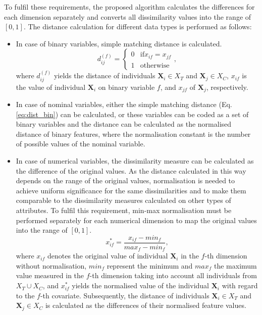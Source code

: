 		To fulfil these requirements, the proposed algorithm calculates the differences for each dimension separately and converts all dissimilarity values into the range of $[0,1]$. The distance calculation for different data types is performed as follows:					
		\begin{itemize}
			\item In case of binary variables, simple matching distance is calculated.
			      \begin{equation}
			      	\label{eq:dist_bin}
			      	d_{ij}^{(f)}=
			      	\begin{cases} 
			      		0 & \text{if} x_{if}=x_{jf} \\
			      		1 & \text{otherwise}        
			      	\end{cases},
			      \end{equation}
			      \noindent where $d_{ij}^{(f)}$ yields the distance of individuals $\textbf{X}_i \in X_T$ and $\textbf{X}_j \in X_C$, $x_{if}$ is the value of individual $\textbf{X}_i$ on binary variable $f$, and $x_{jf}$ of $\textbf{X}_j$, respectively.  
			\item In case of nominal variables, either the simple matching distance (Eq. \ref{eq:dist_bin}) can be calculated, or these variables can be coded as a set of binary variables and the distance can be calculated as the normalised distance of binary features, where the normalisation constant is the number of possible values of the nominal variable.   
			\item In case of numerical variables, the dissimilarity measure can be calculated as the difference of the original values. As the distance calculated in this way depends on the range of the original values, normalisation is needed to achieve uniform significance for the same dissimilarities and to make them comparable to the dissimilarity measures calculated on other types of attributes. To fulfil this requirement, min-max normalisation must be performed separately for each numerical dimension to map the original values into the range of $[0,1]$.  
			      \begin{equation}
			      	\label{eq:minmax}
			      	x^{*}_{if}=\frac{x_{if}-min_f}{max_f-min_f},
			      \end{equation}
			      where $x_{if}$ denotes the original value of individual $\textbf{X}_i$ in the $f$-th dimension without normalisation, $min_f$ represent the minimum and $max_f$ the maximum value measured in the $f$-th dimension taking into account all individuals from ${X_T \cup X_C}$, and $x^{*}_{if}$ yields the normalised value of the individual $\textbf{X}_i$ with regard to the $f$-th covariate. Subsequently, the distance of individuals $\textbf{X}_i \in X_T$ and $\textbf{X}_j \in X_C$ is calculated as the differences of their normalised feature values.	       

\end{itemize}
